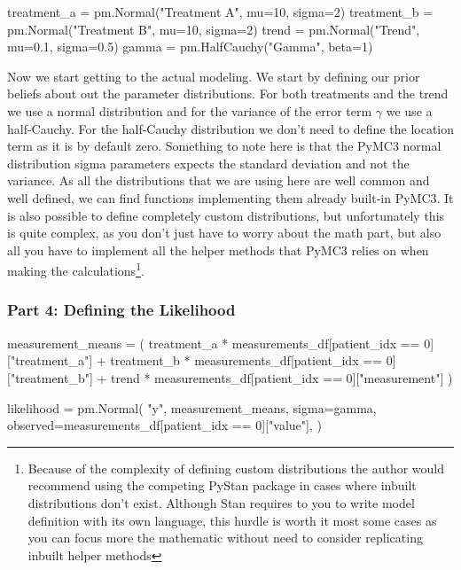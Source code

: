 \documentclass[12pt,a4paper,leqno]{report}
\theoremstyle{plain}
\theoremstyle{definition}
\theoremstyle{remark}
\begin{document}
\bigskip
\begin{pyverbatim}[][fontsize=\footnotesize]
    treatment_a = pm.Normal("Treatment A", mu=10, sigma=2)
    treatment_b = pm.Normal("Treatment B", mu=10, sigma=2)
    trend = pm.Normal("Trend", mu=0.1, sigma=0.5)
    gamma = pm.HalfCauchy("Gamma", beta=1)
\end{pyverbatim}
\smallskip

Now we start getting to the actual modeling. We start by defining our prior beliefs about
out the parameter distributions. For both treatments and the trend we use a normal distribution and
for the variance of the error term \(\gamma \) we use a half-Cauchy. For the half-Cauchy
distribution we don't need to define the location term as it is by default zero.
Something to note here is that the PyMC3 normal distribution sigma
parameters expects the standard deviation and not the variance. As all the distributions
that we are using here are well common and well defined, we can find functions implementing
them already built-in PyMC3. It is also possible to define completely custom
distributions, but unfortunately this is quite complex, as you don't just have to worry
about the math part, but also all you have to implement all the helper methods that PyMC3
relies on when making the calculations\footnote{Because of the complexity of defining
custom distributions the author would recommend using the competing PyStan package in
cases where inbuilt distributions don't exist. Although Stan requires to you to write
model definition with its own language, this hurdle is worth it most some cases as you can focus
more the mathematic without need to consider replicating inbuilt helper methods}.

\subsubsection*{Part 4: Defining the Likelihood}

\bigskip
\begin{pyverbatim}[][fontsize=\footnotesize]
    measurement_means = (
        treatment_a
        * measurements_df[patient_idx == 0]["treatment_a"]
        + treatment_b
        * measurements_df[patient_idx == 0]["treatment_b"]
        + trend
        * measurements_df[patient_idx == 0]["measurement"]
    )

    likelihood = pm.Normal(
        "y",
        measurement_means,
        sigma=gamma,
        observed=measurements_df[patient_idx == 0]["value"],
    )
\end{pyverbatim}
\smallskip
\end{document}

